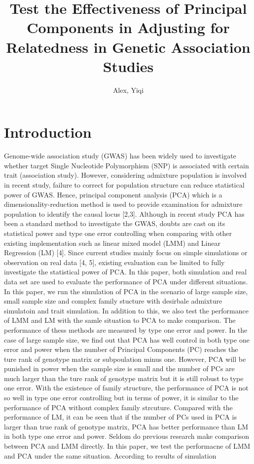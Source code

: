 \documentclass[12pt]{article}
\title{Test the Effectiveness of Principal Components in Adjusting for Relatedness in Genetic Association Studies}
\author{Alex, Yiqi }
\begin{document}
	\maketitle
	
	
\section{Introduction} 

Genome-wide association study (GWAS) has been widely used to investigate whether target Single Nucleotide Polymorphism (SNP) is associated with certain trait (association study). However, considering admixture population is involved in recent study, failure to correct for population structure can reduce statistical power of GWAS. Hence, principal component analysis (PCA) which is a dimensionality-reduction method is used to provide examination for admixture population to identify the causal locus [2,3]. Although in recent study PCA has been a standard method to investigate the GWAS, doubts are cast on its statistical power and type one error controlling when comparing with other existing implementation such as linear mixed model (LMM) and Linear Regression (LM) [4]. Since current studies mainly focus on simple simulations or observation on real data [4, 5], existing evaluation can be limited to fully investigate the statistical power of PCA. In this paper, both simulation and real data set are used to evaluate the performance of PCA under different situations.\\

In this paper, we run the simulation of PCA in the scenario of large sample size, small sample size and complex family stucture with desirbale admixture simulatoin and trait simulation. In addition to this, we also test the performance of LMM and LM with the samle situation to PCA to make comparison. The performance of thess methods are measured by type one error and power. In the case of large sample size, we find out that PCA has well control in both type one error and power when the number of Principal Components (PC) reaches the ture rank of genotype matrix or subpoulation minus one. However, PCA will be punished in power when the sample size is small and the number of PCs are much larger than the ture rank of genotype matrix but it is still robust to type one error. With the existence of family structure, the performance of PCA is not so well in type one error controlling but in terms of power, it is similar to the performance of PCA without complex family strcuture. Compared with the performance of LM, it can be seen that if the number of PCs used in PCA is larger than true rank of genotype matrix, PCA has better performance than LM in both type one error and power. Seldom do previous research make comparison between PCA and LMM directly. In this paper, we test the performacne of LMM and PCA under the same situation. According to results of simulation
 
\end{document}
